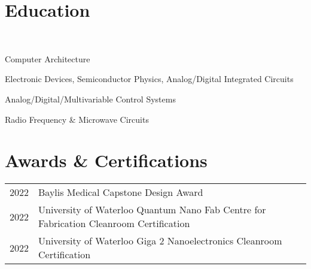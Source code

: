 \documentclass[]{chandan-cv}
\begin{document}
\begin{minipage}[t]{0.77\textwidth}
\section{Education}

 \\


\descript{ }
\location{ }
\begin{tightemize}
        \item Computer Architecture
		\item Electronic Devices, Semiconductor Physics, Analog/Digital Integrated Circuits
		\item Analog/Digital/Multivariable Control Systems
		\item Radio Frequency \& Microwave Circuits
\end{tightemize}
\sectionsep


\section{Awards \& Certifications}
\begin{tabular}{rll}
	2022		&	Baylis Medical Capstone Design Award\\
	2022		&	University of Waterloo Quantum Nano Fab Centre for Fabrication Cleanroom Certification \\
	2022		&	University of Waterloo Giga 2 Nanoelectronics Cleanroom Certification \\
\end{tabular}
\sectionsep
\end{minipage}
\hfill
\end{document}
